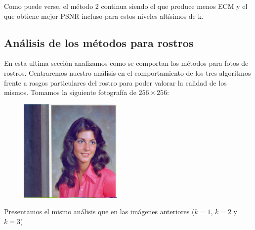 Como puede verse, el método 2 continua siendo el que produce menos ECM y el que obtiene mejor PSNR incluso para estos niveles altísimos de k.

\subsection{Análisis de los métodos para rostros}


En esta ultima sección analizamos como se comportan los métodos para fotos de rostros. Centraremos nuestro análisis en el comportamiento de los tres algoritmos frente a rasgos particulares del rostro para poder valorar la calidad de los mismos. Tomamos la siguiente fotografía de $256\times 256$:

\begin{figure}[H]
\centering
\includegraphics[width=5cm]{fotos/rostro/orig.png}
\end{figure}

Presentamos el mismo análisis que en las imágenes anteriores ($k=1$, $k=2$ y $k=3$)

